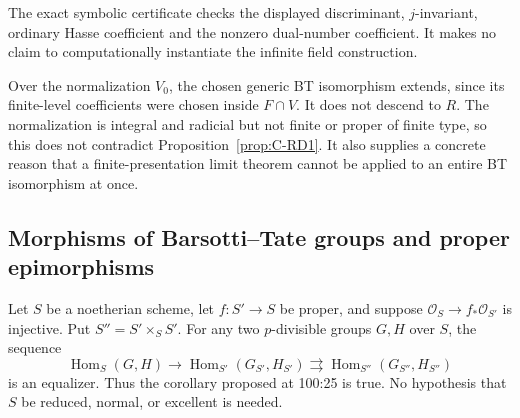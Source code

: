 \begin{remark}
The exact symbolic certificate 
checks the displayed discriminant, $j$-invariant, ordinary Hasse
coefficient and the nonzero dual-number coefficient. It makes no
claim to computationally instantiate the infinite field construction.
\end{remark}

\begin{remark}
Over the normalization $V_0$, the chosen generic BT isomorphism
extends, since its finite-level coefficients were chosen inside
$F\cap V$. It does not descend to $R$. The normalization is integral
and radicial but not finite or proper of finite type, so this does
not contradict Proposition~\ref{prop:C-RD1}. It also supplies a
concrete reason that a finite-presentation limit theorem cannot be
applied to an entire BT isomorphism at once.
\end{remark}

\subsection{Morphisms of Barsotti--Tate groups and proper epimorphisms}

\begin{proposition}\label{prop:C-RD1}
Let $S$ be a noetherian scheme, let $f:S'\to S$ be proper, and suppose
$\mathcal O_S\to f_*\mathcal O_{S'}$ is injective. Put $S''=S'\times_S S'$.
For any two $p$-divisible groups $G,H$ over $S$, the sequence
\[
 \operatorname{Hom}_S(G,H)\longrightarrow
 \operatorname{Hom}_{S'}(G_{S'},H_{S'})
 \rightrightarrows
 \operatorname{Hom}_{S''}(G_{S''},H_{S''})
\]
is an equalizer. Thus the corollary proposed at 100:25 is true. No hypothesis
that $S$ be reduced, normal, or excellent is needed.
\end{proposition}

